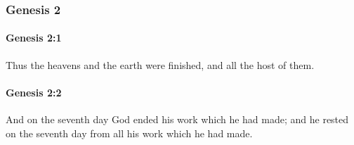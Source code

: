 	\subsubsection{Genesis 2} %
		\label{GENESIS-2}

		\paragraph{Genesis 2:1} %
			\label{GENESIS-2-1}

			Thus the heavens and the earth were finished, and all the host of them.


		\paragraph{Genesis 2:2} %
			\label{GENESIS-2-2}

			And on the seventh day God ended his work which he had made; and he rested on the seventh day from all his work which he had made.

